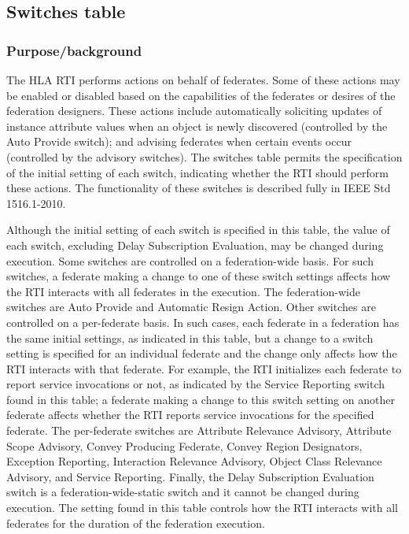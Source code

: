 \subsection{Switches table}

\subsubsection{Purpose/background}
The HLA RTI performs actions on behalf of federates. Some of these actions may be enabled or disabled based on the capabilities of the federates or desires of the federation designers. These actions include automatically soliciting updates of instance attribute values when an object is newly discovered (controlled by the Auto Provide switch); and advising federates when certain events occur (controlled by the advisory switches). The switches table permits the specification of the initial setting of each switch, indicating whether the RTI should perform these actions. The functionality of these switches is described fully in IEEE Std 1516.1-2010.

Although the initial setting of each switch is specified in this table, the value of each switch, excluding Delay Subscription Evaluation, may be changed during execution. Some switches are controlled on a federation-wide basis. For such switches, a federate making a change to one of these switch settings affects how the RTI interacts with all federates in the execution. The federation-wide switches are Auto Provide and Automatic Resign Action. Other switches are controlled on a per-federate basis. In such cases, each federate in a federation has the same initial settings, as indicated in this table, but a change to a switch setting is specified for an individual federate and the change only affects how the RTI interacts with that federate. For example, the RTI initializes each federate to report service invocations or not, as indicated by the Service Reporting switch found in this table; a federate making a change to this switch setting on another federate affects whether the RTI reports service invocations for the specified federate. The per-federate switches are Attribute Relevance Advisory, Attribute Scope Advisory, Convey Producing Federate, Convey Region Designators, Exception Reporting, Interaction Relevance Advisory, Object Class Relevance Advisory, and Service Reporting. Finally, the Delay Subscription Evaluation switch is a federation-wide-static switch and it cannot be changed during execution. The setting found in this table controls how the RTI interacts with all federates for the duration of the federation execution.

